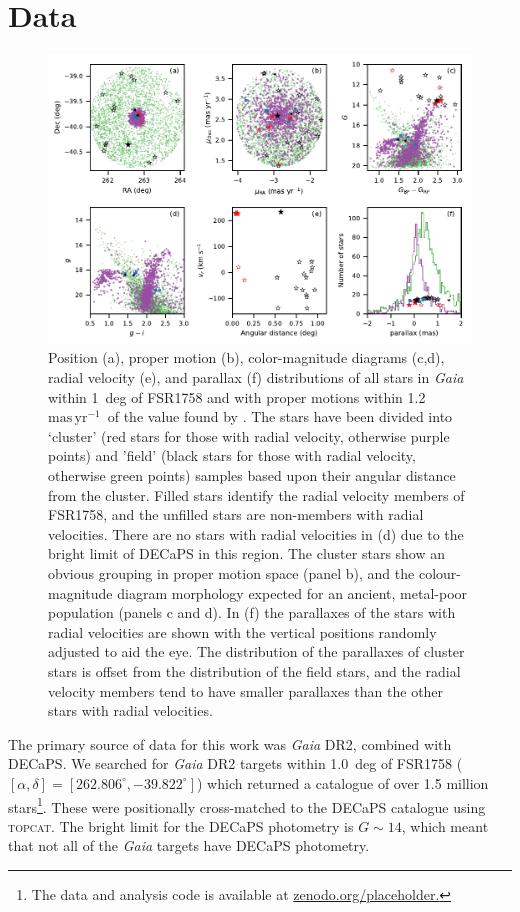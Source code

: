 \documentclass[fleqn,usenatbib,letters]{mnras}
\newcommand{\masyr}{~\ensuremath{\textrm{mas}\,\textrm{yr}^{-1}}}
\begin{document}
\section{Data}\label{sec:data}
\begin{figure}
\includegraphics[width=\textwidth]{figures/cmd.pdf}
\caption{Position (a), proper motion (b), color-magnitude diagrams (c,d), radial velocity (e), and parallax (f) distributions of all stars in \textit{Gaia} within 1~deg of FSR1758 and with proper motions within 1.2~\masyr\ of the value found by . The stars have been divided into `cluster' (red stars for those with radial velocity, otherwise purple points) and 'field' (black stars for those with radial velocity, otherwise green points) samples based upon their angular distance from the cluster. Filled stars identify the radial velocity members of FSR1758, and the unfilled stars are non-members with radial velocities. There are no stars with radial velocities in (d) due to the bright limit of DECaPS in this region. The cluster stars show an obvious grouping in proper motion space (panel b), and the colour-magnitude diagram morphology expected for an ancient, metal-poor population (panels c and d). In (f) the parallaxes of the stars with radial velocities are shown with the vertical positions randomly adjusted to aid the eye. The distribution of the parallaxes of cluster stars is offset from the distribution of the field stars, and the radial velocity members tend to have smaller parallaxes than the other stars with radial velocities.}
\label{fig:cmd}
\end{figure}

The primary source of data for this work was \textit{Gaia} DR2, combined with DECaPS. We searched for \textit{Gaia} DR2 targets within 1.0~deg of FSR1758 ($[\alpha,\delta]=[262.806^\circ,-39.822^\circ]$) which returned a catalogue of over 1.5 million stars\footnote{The data and analysis code is available at \url{zenodo.org/placeholder.}}. These were positionally cross-matched to the DECaPS catalogue using \textsc{topcat}. The bright limit for the DECaPS photometry is $G\sim14$, which meant that not all of the \textit{Gaia} targets have DECaPS photometry.
\end{document}

